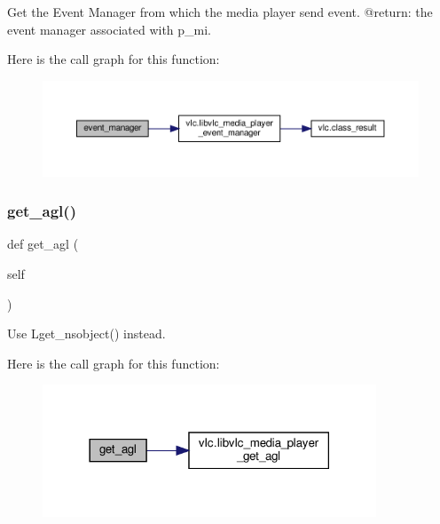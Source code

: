 \begin{DoxyVerb}Get the Event Manager from which the media player send event.
@return: the event manager associated with p_mi.
\end{DoxyVerb}
 Here is the call graph for this function\+:
\nopagebreak
\begin{figure}[H]
\begin{center}
\leavevmode
\includegraphics[width=350pt]{classvlc_1_1_media_player_ab7c92812cd259eb8e4e4fd292b81bfaa_cgraph}
\end{center}
\end{figure}
\mbox{\label{classvlc_1_1_media_player_a9b040825ae99c2db63307dee719c4155}} 
\subsubsection{\texorpdfstring{get\+\_\+agl()}{get\_agl()}}
{\footnotesize\ttfamily def get\+\_\+agl (\begin{DoxyParamCaption}\item[{}]{self }\end{DoxyParamCaption})}

\begin{DoxyVerb}\deprecated Use L{get_nsobject}() instead.
\end{DoxyVerb}
 Here is the call graph for this function\+:
\nopagebreak
\begin{figure}[H]
\begin{center}
\leavevmode
\includegraphics[width=282pt]{classvlc_1_1_media_player_a9b040825ae99c2db63307dee719c4155_cgraph}
\end{center}
\end{figure}
\mbox{\label{classvlc_1_1_media_player_a61aac7a7f6bf0a4765bc9ca4e53ab1a6}} 
